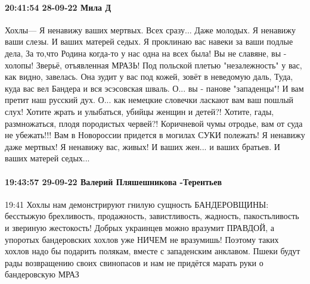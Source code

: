 \paragraph{20:41:54 28-09-22 Мила Д}
Хохлы---
Я ненавижу ваших мертвых. Всех сразу... Даже молодых.
Я ненавижу ваши слезы. И ваших матерей седых.
Я проклинаю вас навеки за ваши подлые дела,
За то,что Родина когда-то у нас одна на всех была!
Вы не славяне, вы - холопы! Зверьё, отъявленная МРАЗЬ!
Под польской плетью "незалежность" у вас, как видно, завелась.
Она зудит у вас под кожей, зовёт в неведомую даль,
Туда, куда вас вел Бандера и вся эсэсовская шваль.
О... вы - панове "западенцы"! И вам претит наш русский дух.
О... как немецкие словечки ласкают вам ваш пошлый слух!
Хотите жрать и улыбаться, убийцы женщин и детей?!
Хотите, гады, размножаться, плодя породистых червей?!
Коричневой чумы отродье, вам от суда не убежать!!!
Вам в Новороссии придется в могилах СУКИ полежать!
Я ненавижу даже мертвых! Я ненавижу вас, живых!
И ваших жен... и ваших братьев. И ваших матерей седых...


\paragraph{19:43:57 29-09-22 Валерий Пляшешникова -Терентьев}

19:41
Хохлы нам демонстрируют гнилую сущность БАНДЕРОВЩИНЫ: бесстыжую брехливость, продажность, завистливость, жадность, пакостьливость и звериную жестокость! Добрых украинцев можно вразумит ПРАВДОЙ, а упоротых бандеровских хохлов уже НИЧЕМ не вразумишь! Поэтому таких хохлов надо бы подарить полякам, вместе с западенским анклавом. Пшеки будут рады возвращению своих свинопасов и нам не придётся марать руки о бандеровскую МРАЗ
